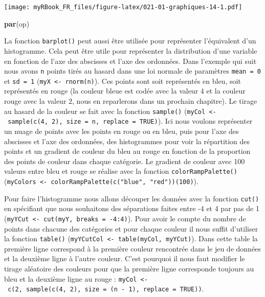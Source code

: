 \documentclass[
]{book}
\newenvironment{Shaded}{\begin{snugshade}}{\end{snugshade}}
\newcommand{\KeywordTok}[1]{\textcolor[rgb]{0.13,0.29,0.53}{\textbf{#1}}}
\newcommand{\NormalTok}[1]{#1}
\begin{document}
\texttt{[image: myRBook\_FR\_files/figure-latex/021-01-graphiques-14-1.pdf]}

\begin{Shaded}
\begin{Highlighting}[]
\KeywordTok{par}\NormalTok{(op)}
\end{Highlighting}
\end{Shaded}

La fonction \texttt{barplot()} peut aussi être utilisée pour représenter l'équivalent d'un histogramme. Cela peut être utile pour représenter la distribution d'une variable en fonction de l'axe des abscisses et l'axe des ordonnées. Dans l'exemple qui suit nous avons \texttt{n} points tirés au hasard dans une loi normale de paramètres \texttt{mean\ =\ 0} et \texttt{sd\ =\ 1} (\texttt{myX\ \textless{}-\ rnorm(n)}). Ces points sont soit représentés en bleu, soit représentés en rouge (la couleur bleue est codée avec la valeur 4 et la couleur rouge avec la valeur 2, nous en reparlerons dans un prochain chapitre). Le tirage au hasard de la couleur se fait avec la fonction \texttt{sample()} (\texttt{myCol\ \textless{}-\ sample(c(4,\ 2),\ size\ =\ n,\ replace\ =\ TRUE)}). Ici nous voulons représenter un nuage de points avec les points en rouge ou en bleu, puis pour l'axe des abscisses et l'axe des ordonnées, des histogrammes pour voir la répartition des points et un gradient de couleur du bleu au rouge en fonction de la proportion des points de couleur dans chaque catégorie. Le gradient de couleur avec 100 valeurs entre bleu et rouge se réalise avec la fonction \texttt{colorRampPalette()} (\texttt{myColors\ \textless{}-\ colorRampPalette(c("blue",\ "red"))(100)}).

Pour faire l'histogramme nous allons découper les données avec la fonction \texttt{cut()} en spécifiant que nous souhaitons des séparations faites entre -4 et 4 par pas de 1 (\texttt{myYCut\ \textless{}-\ cut(myY,\ breaks\ =\ -4:4)}). Pour avoir le compte du nombre de points dans chacune des catégories et pour chaque couleur il nous suffit d'utiliser la fonction \texttt{table()} (\texttt{myYCutCol\ \textless{}-\ table(myCol,\ myYCut)}). Dans cette table la première ligne correspond à la première couleur rencontrée dans le jeu de données et la deuxième ligne à l'autre couleur. C'est pourquoi il nous faut modifier le tirage aléatoire des couleurs pour que la première ligne corresponde toujours au bleu et la deuxième ligne au rouge : \texttt{myCol\ \textless{}-\ c(2,\ sample(c(4,\ 2),\ size\ =\ (n\ -\ 1),\ replace\ =\ TRUE))}.
\end{document}
